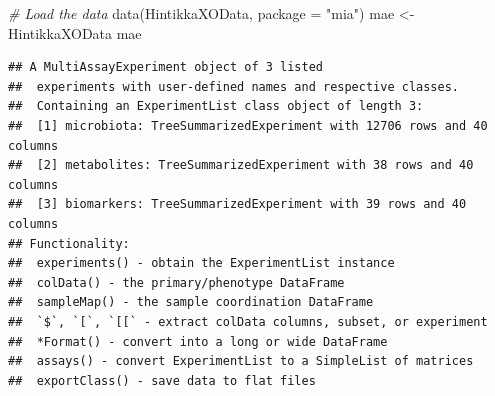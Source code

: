 \documentclass[
]{book}
\newenvironment{Shaded}{\begin{snugshade}}{\end{snugshade}}
\newcommand{\AttributeTok}[1]{\textcolor[rgb]{0.77,0.63,0.00}{#1}}
\newcommand{\CommentTok}[1]{\textcolor[rgb]{0.56,0.35,0.01}{\textit{#1}}}
\newcommand{\ControlFlowTok}[1]{\textcolor[rgb]{0.13,0.29,0.53}{\textbf{#1}}}
\newcommand{\DecValTok}[1]{\textcolor[rgb]{0.00,0.00,0.81}{#1}}
\newcommand{\FunctionTok}[1]{\textcolor[rgb]{0.00,0.00,0.00}{#1}}
\newcommand{\NormalTok}[1]{#1}
\newcommand{\OtherTok}[1]{\textcolor[rgb]{0.56,0.35,0.01}{#1}}
\newcommand{\SpecialCharTok}[1]{\textcolor[rgb]{0.00,0.00,0.00}{#1}}
\newcommand{\StringTok}[1]{\textcolor[rgb]{0.31,0.60,0.02}{#1}}
\begin{document}
\begin{Shaded}
\begin{Highlighting}[]
\CommentTok{\# Load the data}
\FunctionTok{data}\NormalTok{(HintikkaXOData, }\AttributeTok{package =} \StringTok{"mia"}\NormalTok{)}
\NormalTok{mae }\OtherTok{\textless{}{-}}\NormalTok{ HintikkaXOData}
\NormalTok{mae}
\end{Highlighting}
\end{Shaded}

\begin{verbatim}
## A MultiAssayExperiment object of 3 listed
##  experiments with user-defined names and respective classes.
##  Containing an ExperimentList class object of length 3:
##  [1] microbiota: TreeSummarizedExperiment with 12706 rows and 40 columns
##  [2] metabolites: TreeSummarizedExperiment with 38 rows and 40 columns
##  [3] biomarkers: TreeSummarizedExperiment with 39 rows and 40 columns
## Functionality:
##  experiments() - obtain the ExperimentList instance
##  colData() - the primary/phenotype DataFrame
##  sampleMap() - the sample coordination DataFrame
##  `$`, `[`, `[[` - extract colData columns, subset, or experiment
##  *Format() - convert into a long or wide DataFrame
##  assays() - convert ExperimentList to a SimpleList of matrices
##  exportClass() - save data to flat files
\end{verbatim}

\begin{Shaded}
\end{Shaded}
\end{document}
